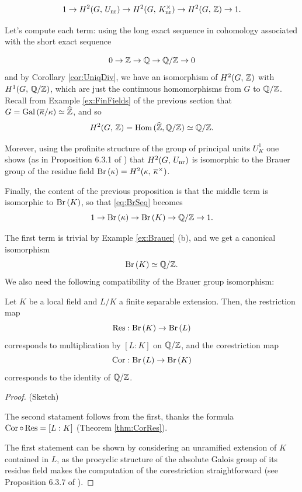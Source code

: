 \documentclass[a4paper, oneside]{memoir}
\begin{document}
\begin{equation}\label{eq:BrSeq}
	1\to H^{2}( G, \, U_{\text{nr}} )\to H^{2}( G, \, K_{\text{nr}}^\times )\to H^{2}( G, \, \mathbb{Z} )\to 1.
\end{equation}

Let's compute each term: using the long exact sequence in cohomology associated with the short exact sequence

\[
	0\to\mathbb{Z}\to\mathbb{Q}\to\mathbb{Q}/\mathbb{Z}\to 0
\]
and by Corollary \ref{cor:UniqDiv}, we have an isomorphism of $H^{2}( G, \, \mathbb{Z} )$ with $H^{1}( G, \, \mathbb{Q}/\mathbb{Z} )$, which are just the continuous homomorphisms from $G$ to $\mathbb{Q}/\mathbb{Z}$. Recall from Example
\ref{ex:FinFields} of the previous
section that $G=\operatorname{Gal}{(\overline{\kappa}/\kappa)}\simeq\widehat{\mathbb{Z}}$, and so
\[
	H^{2}( G, \, \mathbb{Z} )=\operatorname{Hom}{(\widehat{\mathbb{Z}},\mathbb{Q}/\mathbb{Z})}\simeq\mathbb{Q}/\mathbb{Z}.
\]

Morever, using the profinite structure of the group of principal units $U_K^1$ one shows (as in Proposition 6.3.1 of \cite{GilleSzamuely}) that $H^{2}( G, \, U_{\text{nr}} )$ is isomorphic to
the Brauer group of the residue field $\operatorname{Br}{(\kappa)}=H^{2}( \kappa, \, \overline{\kappa}^\times )$.

Finally, the content of the previous proposition is that the middle term is isomorphic to $\operatorname{Br}{(K)}$, so that \eqref{eq:BrSeq} becomes
\[
	1\to\operatorname{Br}{(\kappa)}\to\operatorname{Br}{(K)}\to\mathbb{Q}/\mathbb{Z}\to 1.
\]

The first term is trivial by Example \ref{ex:Brauer} (b), and we get a canonical isomorphism
\begin{equation}\label{eq:BrK}
	\operatorname{Br}{(K)}\simeq\mathbb{Q}/\mathbb{Z}.
\end{equation}
We also need the following compatibility of the Brauer group isomorphism:

\begin{proposition}\label{prop:BrCorRes}
	Let $K$ be a local field and $L/K$ a finite separable extension. Then, the restriction map
	\[
		\operatorname{Res}: \operatorname{Br}{(K)}\to\operatorname{Br}{(L)}
	\]
	corresponds to multiplication by $[L:K]$ on $\mathbb{Q}/\mathbb{Z}$,
	and the corestriction map
	\[
		\operatorname{Cor}: \operatorname{Br}{(L)}\to\operatorname{Br}{(K)}
	\]
	corresponds to the identity of $\mathbb{Q}/\mathbb{Z}$.
\end{proposition}

\begin{proof}{(Sketch)}

	The second statament follows from the first, thanks the formula $\operatorname{Cor} \circ \operatorname{Res} = [L:K]$ (Theorem \ref{thm:CorRes}).

	The first statement can be shown by considering an unramified extension of $K$ contained in $L$, as the procyclic structure of the absolute Galois group of its residue field makes the computation of the corestriction
	straightforward (see Proposition 6.3.7 of \cite{GilleSzamuely}).
\end{proof}
\end{document}

